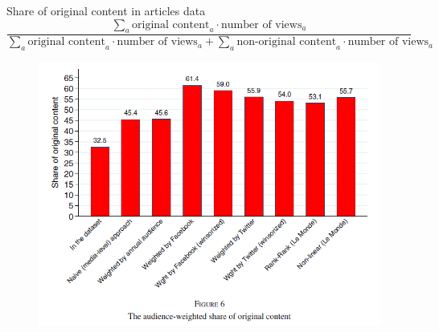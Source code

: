 \documentclass[english]{beamer}
\begin{document}
\begin{frame}{Share of original content in articles data}
    \setlength{\itemsep}{0.8em}
        \tiny
        \begin{equation*}
            \frac{\sum_a \text{original content}_a \cdot \text{number of views}_a}{\sum_a \text{original content}_a \cdot \text{number of views}_a + \sum_a \text{non-original content}_a \cdot \text{number of views}_a}
        \end{equation*}
    
\begin{figure}
    \centering
    \includegraphics[scale = 0.65]{Images/cage-4.PNG}
\end{figure}
\end{frame}
\end{document}
